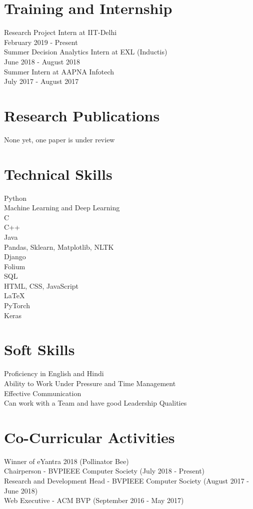 \documentclass{article}
\begin{document}
\section{Training and Internship}
Research Project Intern at IIT-Delhi\\February 2019 - Present
\\Summer Decision Analytics Intern at EXL (Inductis)\\June 2018 - August 2018
\\Summer Intern at AAPNA Infotech \\ July 2017 - August 2017

\section{Research Publications}
None yet, one paper is under review

\section{Technical Skills}
Python
\\ Machine Learning and Deep Learning
\\C
\\C++
\\Java
\\ Pandas, Sklearn, Matplotlib, NLTK
\\ Django
\\ Folium
\\SQL
\\HTML, CSS, JavaScript
\\\LaTeX
\\PyTorch
\\Keras

\section{Soft Skills}
Proficiency in English and Hindi 
\\Ability to Work Under Pressure and Time Management
\\ Effective Communication 
\\ Can work with a Team and have good Leadership Qualities 

\section{Co-Curricular Activities}
Winner of eYantra 2018 (Pollinator Bee)
\\Chairperson - BVPIEEE Computer Society (July 2018 - Present)
\\Research and Development Head - BVPIEEE Computer Society (August 2017 - June 2018)
\\Web Executive - ACM BVP (September 2016 - May 2017)
\end{document}
